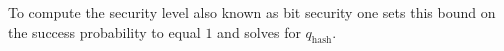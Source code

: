 To compute the security level also known as bit security one sets this bound on
the success probability to
equal $1$ and solves for $q_{\text{hash}}$.

%
%
%
%
%
%
%

